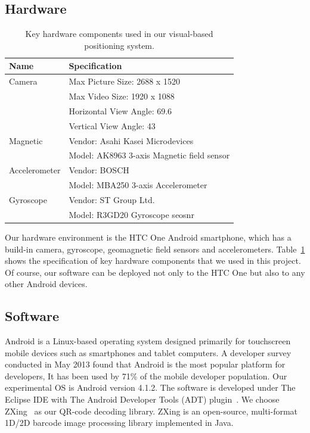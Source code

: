 \subsection{Hardware}
\begin{table}
\begin{center}
   \vspace{-35pt}
    \begin{tabular}{ | l | l |}
    \hline
    Name & Specification \\ \hline\hline
    Camera & Max Picture Size: 2688 x 1520 \\
    & Max Video Size: 1920 x 1088 \\
    & Horizontal View Angle: 69.6 \\
    &Vertical View Angle: 43 \\ \hline
    Magnetic & Vendor: Asahi Kasei Microdevices \\
    & Model: AK8963 3-axis Magnetic field sensor \\ \hline
    Accelerometer & Vendor: BOSCH \\
    & Model: MBA250 3-axis Accelerometer \\ \hline
    Gyroscope & Vendor: ST Group Ltd. \\
    & Model: R3GD20 Gyroscope seosnr \\ \hline
    \end{tabular}
\end{center}
\vspace{-15pt}
\caption{Key hardware components used in our visual-based positioning system.}\label{tb-key-hardware}
\end{table} 
Our hardware environment is the HTC One Android smartphone, which has a build-in camera, gyroscope, geomagnetic field sensors and accelerometers.
Table~\ref{tb-key-hardware} shows the specification of key hardware components that we used in this project. Of course, our software can be deployed not only to the HTC One but also to any other Android devices.
\\
\subsection{Software}
Android is a Linux-based operating system designed primarily for touchscreen mobile devices such as smartphones and tablet computers. A developer survey conducted in May 2013 found that Android is the most popular platform for developers, It has been used by 71\% of the mobile developer population. Our experimental OS is Android version 4.1.2. The software is developed under The Eclipse IDE with The Android Developer Tools (ADT) plugin~\cite{developers2013adt}.
We choose ZXing~\cite{mackintosh2012zxing} as our QR-code decoding library. ZXing is an open-source, multi-format 1D/2D barcode image processing library implemented in Java.

